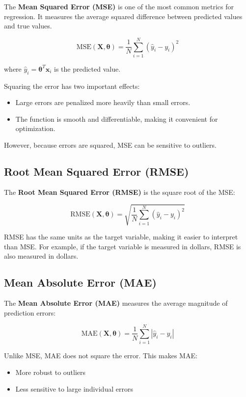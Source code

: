 \documentclass{article}
\newcommand{\vecb}[1]{\boldsymbol{#1}} %
\newcommand{\matb}[1]{\mathbf{#1}}     %
\newcommand{\vb}[1]{\mathbf{#1}}       %
\begin{document}
The \textbf{Mean Squared Error (MSE)} is one of the most common metrics for regression.  
It measures the average squared difference between predicted values and true values.

\[
\text{MSE}(\matb{X},\vecb{\theta})=\frac{1}{N}\sum_{i=1}^{N}(\hat{y}_i-y_i)^2
\]

where $\hat{y}_i=\vecb{\theta}^T\vb{x}_i$ is the predicted value.

Squaring the error has two important effects:

\begin{itemize}
\item Large errors are penalized more heavily than small errors.
\item The function is smooth and differentiable, making it convenient for optimization.
\end{itemize}

However, because errors are squared, MSE can be sensitive to outliers.

\subsection{Root Mean Squared Error (RMSE)}

The \textbf{Root Mean Squared Error (RMSE)} is the square root of the MSE:

\[
\text{RMSE}(\matb{X},\vecb{\theta})=\sqrt{\frac{1}{N}\sum_{i=1}^{N}(\hat{y}_i-y_i)^2}
\]

RMSE has the same units as the target variable, making it easier to interpret than MSE.  
For example, if the target variable is measured in dollars, RMSE is also measured in dollars.

\subsection{Mean Absolute Error (MAE)}

The \textbf{Mean Absolute Error (MAE)} measures the average magnitude of prediction errors:

\[
\text{MAE}(\matb{X},\vecb{\theta})=\frac{1}{N}\sum_{i=1}^{N}|\hat{y}_i-y_i|
\]

Unlike MSE, MAE does not square the error. This makes MAE:

\begin{itemize}
\item More robust to outliers
\item Less sensitive to large individual errors
\end{itemize}
\end{document}
